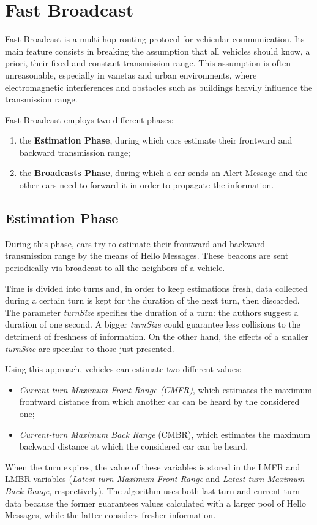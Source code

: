 
\chapter{Fast Broadcast}
	\label{chapter:fb}
	Fast Broadcast \cite{4199282} is a multi-hop routing protocol for vehicular communication. Its main feature consists in breaking the assumption that all vehicles should know, a priori, their fixed and constant transmission range. This assumption is often unreasonable, especially in \acrshort{vaneta}s and urban environments, where electromagnetic interferences and obstacles such as buildings heavily influence the transmission range.
	
	
	Fast Broadcast employs two different phases:
	\begin{enumerate}
		\item the \textbf{Estimation Phase}, during which cars estimate their frontward and backward transmission range;
		\item the \textbf{Broadcasts Phase}, during which a car sends an Alert Message and the other cars need to forward it in order to propagate the information.
	\end{enumerate}

	\section{Estimation Phase}
		During this phase, cars try to estimate their frontward and backward transmission range by the means of Hello Messages. These beacons are sent periodically via broadcast to all the neighbors of a vehicle.
		
		
		Time is divided into turns and, in order to keep estimations fresh, data collected during a certain turn is kept for the duration of the next turn, then discarded. The parameter \textit{turnSize} specifies the duration of a turn: the authors suggest a duration of one second. A bigger \textit{turnSize} could guarantee less collisions to the detriment of freshness of information. On the other hand, the effects of a smaller \textit{turnSize} are specular to those just presented. 
		
		
		Using this approach, vehicles can estimate two different values:
		\begin{itemize}
			\item \textit{Current-turn Maximum Front Range (CMFR)}, which estimates the maximum frontward distance from which another car can be heard by the considered one;
			\item \textit{Current-turn Maximum Back Range} (CMBR), which estimates the maximum backward distance at which the considered car can be heard.
		\end{itemize}
		When the turn expires, the value of these variables is stored in the LMFR and LMBR variables (\textit{Latest-turn Maximum Front Range} and \textit{Latest-turn Maximum Back Range}, respectively). The algorithm uses both last turn and current turn data because the former guarantees values calculated with a larger pool of Hello Messages, while the latter considers fresher information.
		
